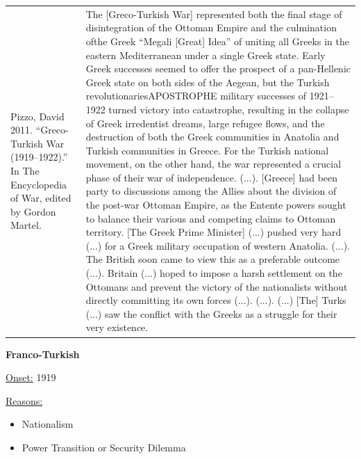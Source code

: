 {\begin{longtable}{p{}p{}}
\\
Pizzo, David 2011. “Greco-Turkish War (1919–1922).” In The Encyclopedia of War, edited by Gordon Martel. & The [Greco-Turkish War] represented both the final stage of disintegration of the Ottoman Empire and the culmination ofthe Greek “Megali [Great] Idea” of uniting all Greeks in the eastern Mediterranean under a single Greek state. Early Greek successes seemed to offer the prospect of a pan-Hellenic Greek state on both sides of the Aegean, but the Turkish revolutionariesAPOSTROPHE military successes of 1921–1922 turned victory into catastrophe, resulting in the collapse of Greek irredentist dreams, large refugee flows, and the destruction of both the Greek communities in Anatolia and Turkish communities in Greece. For the Turkish national movement, on the other hand, the war represented a crucial phase of their war of independence. (...).
[Greece] had been party to discussions among the Allies about the division of the post-war Ottoman Empire, as the Entente powers sought to balance their various and competing claims to Ottoman territory. [The Greek Prime Minister] (...) pushed very hard (...) for a Greek military occupation of western Anatolia. (...). The British soon came to view this as a preferable outcome (...). Britain (...) hoped to impose a harsh settlement on the Ottomans and prevent the victory of the nationalists without directly committing its own forces (...). (...). (...) [The] Turks (...) saw the conflict with the Greeks as a struggle for their very existence.
\\
\end{longtable}}
\clearpage
         \textbf{Franco-Turkish} 

          \underline{Onset:} 1919         

\underline{Reasons:}
\begin{itemize}
\item Nationalism
\item Power Transition or Security Dilemma
\end{itemize}

